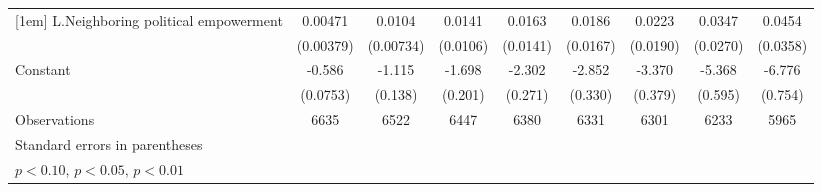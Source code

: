 \begin{table}[htbp]
\begin{tabular}{l*{8}{c}}
[1em]
L.Neighboring political empowerment&     0.00471         &      0.0104         &      0.0141         &      0.0163         &      0.0186         &      0.0223         &      0.0347         &      0.0454         \\
                    &   (0.00379)         &   (0.00734)         &    (0.0106)         &    (0.0141)         &    (0.0167)         &    (0.0190)         &    (0.0270)         &    (0.0358)         \\
[1em]
Constant            &      -0.586\sym{***}&      -1.115\sym{***}&      -1.698\sym{***}&      -2.302\sym{***}&      -2.852\sym{***}&      -3.370\sym{***}&      -5.368\sym{***}&      -6.776\sym{***}\\
                    &    (0.0753)         &     (0.138)         &     (0.201)         &     (0.271)         &     (0.330)         &     (0.379)         &     (0.595)         &     (0.754)         \\
\hline
Observations        &        6635         &        6522         &        6447         &        6380         &        6331         &        6301         &        6233         &        5965         \\
\hline\hline
\multicolumn{9}{l}{\footnotesize Standard errors in parentheses}\\
\multicolumn{9}{l}{\footnotesize \sym{*} \(p<0.10\), \sym{**} \(p<0.05\), \sym{***} \(p<0.01\)}\\
\end{tabular}
\end{table}
